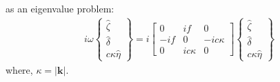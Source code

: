 as an eigenvalue problem:
\begin{align}
 i\omega
   \begin{Bmatrix}
       \hat{\zeta} \\ \hat{\delta} \\c\kappa\hat{\eta}
  \end{Bmatrix}
  = i
  \begin{bmatrix}
     0 & if & 0 \\
   -if &  0 & -ic\kappa \\
     0 & ic\kappa & 0 
  \end{bmatrix}
  \begin{Bmatrix}
       \hat{\zeta} \\ \hat{\delta} \\c\kappa\hat{\eta}
  \end{Bmatrix}
\end{align}
where, $\kappa = |\mathbf{k}|$.


